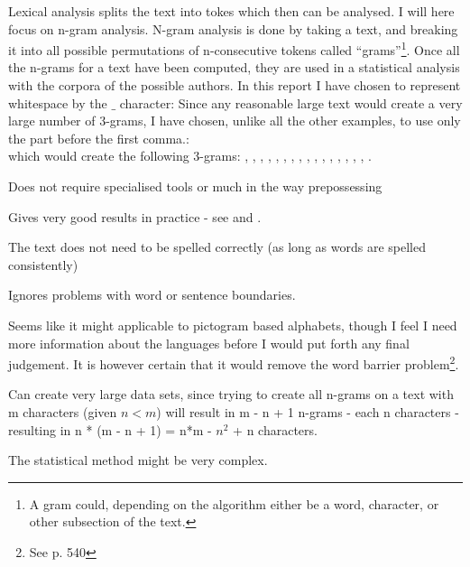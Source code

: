 {\label{character}
Lexical analysis splits the text into tokes which then can be analysed. I will here focus on n-gram analysis. N-gram analysis is done by taking a text, and breaking it into all possible permutations of n-consecutive tokens called ``grams''\footnote{A gram could, depending on the algorithm either be a word, character, or other subsection of the text.}. Once all the n-grams for a text have been computed, they are used in a statistical analysis with the corpora of the possible authors. 
}
{
In this report I have chosen to represent whitespace by the $\_$ character: Since any reasonable large text would create a very large number of 3-grams, I have chosen, unlike all the other examples, to use only the part before the first comma.:\\
which would create the following 3-grams: , , , , , , , , , , , , , , , , . 
}
{
\item Does not require specialised tools or much in the way prepossessing
\item Gives very good results in practice - see \cite{nr4} and \cite{nr3}.
\item The text does not need to be spelled correctly (as long as words are spelled consistently)
\item Ignores problems with word or sentence boundaries.
\item Seems like it might applicable to pictogram based alphabets, though I feel I need more information about the languages before I would put forth any final judgement. It is however certain that it would remove the word barrier problem\footnote{See \cite{nr1} p. 540}.  
}
{
\item Can create very large data sets, since trying to create all n-grams on a text with m characters (given $n < m$) will result in m - n + 1 n-grams - each n characters - resulting in n * (m - n + 1) = n*m - $n^2$ + n characters.
\item The statistical method might be very complex.
}

